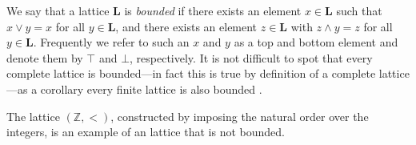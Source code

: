 We say that a lattice $\mathbf{L}$ is \textit{bounded} if there exists an element $x \in \mathbf{L}$ such that $x \vee y = x$ for all $y \in \mathbf{L}$, and there exists an element $z \in \mathbf{L}$ with $z \wedge y = z$ for all $y \in \mathbf{L}$. Frequently we refer to such an $x$ and $y$ as a top and bottom element and denote them by $\top$ and $\bot$, respectively. It is not difficult to spot that every complete lattice is bounded---in fact this is true by definition of a complete lattice---as a corollary every finite lattice is also bounded \cite[p. 36]{davey2002introduction}. 

\begin{remark}
The lattice $(\mathbb{Z}, <)$, constructed by imposing the natural order over the integers, is an example of an lattice that is not bounded.
\end{remark}

